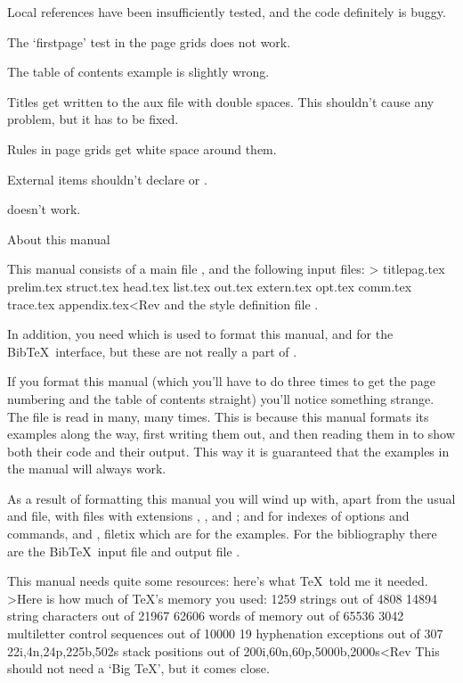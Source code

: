\Enumerate\item Local references have been insufficiently tested,
and the code definitely is buggy.
\item The `firstpage' test in the page grids does not work.
\item The table of contents example is slightly wrong.
\item Titles get written to the aux file with double spaces.
This shouldn't cause any problem, but it has to be fixed.
\item Rules in page grids get white space around them.
\item External items shouldn't declare  or 
.
\item {} doesn't work.
 \>

\Section About this manual

This manual consists of a main file , and the
following input files:
\Ver>
titlepag.tex prelim.tex struct.tex head.tex list.tex
out.tex extern.tex opt.tex comm.tex trace.tex appendix.tex<Rev
and the style definition file .

In addition, you need  which is used to format this
manual, and  for the Bib\TeX\ interface, but these
are not really a part of \Lollipop.

If you format this manual (which you'll have to do three times
to get the page numbering and the table of contents straight) you'll
notice something strange. The file  is read in
many, many times. This is because this manual formats its examples
along the way, first writing them out, and then reading them in to
show both their code and their output. This way it is guaranteed that
the examples in the manual will always work.

As a result of formatting this manual you will wind up with, apart
from the usual  and  file, with  files
with extensions , , and ; 
 and  for indexes of options and commands,
and
, file{tix} which are for the examples. For the
bibliography there are the Bib\TeX\ input file  and
output file .

This manual needs quite some resources: here's what \TeX\ told me
it needed.
\Ver>Here is how much of TeX's memory you used:
 1259 strings out of 4808
 14894 string characters out of 21967
 62606 words of memory out of 65536
 3042 multiletter control sequences out of 10000
 19 hyphenation exceptions out of 307
 22i,4n,24p,225b,502s stack positions out of 
 200i,60n,60p,5000b,2000s<Rev
This should not need a `Big \TeX', but it comes close.

